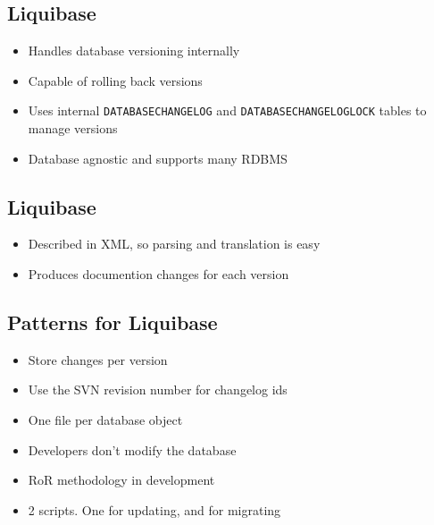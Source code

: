 \documentclass[12pt,notitlepage]{article}
\begin{document}
\begin{s5presentation}
  \W \begin{s5slide}
    \W \section{Liquibase}
    \begin{itemize}
      \item Handles database versioning internally
      \item Capable of rolling back versions
      \item Uses internal \verb|DATABASECHANGELOG| and
        \verb|DATABASECHANGELOGLOCK| tables to manage
        versions
      \item Database agnostic and supports many RDBMS
    \end{itemize}
  \W \end {s5slide}

  \W \begin{s5slide}
    \W \section{Liquibase}
    \begin{itemize}
      \item Described in XML, so parsing and translation is easy
      \item Produces documention changes for each version
    \end{itemize}
  \W \end {s5slide}

  \W \begin{s5slide}
    \W \section{Patterns for Liquibase}
    \begin{itemize}
      \item Store changes per version
      \item Use the SVN revision number for changelog ids
      \item One file per database object
      \item Developers don't modify the database
      \item RoR methodology in development
      \item 2 scripts. One for updating, and for migrating
    \end{itemize}
  \W \end {s5slide}


\end{s5presentation}
\end{document}
